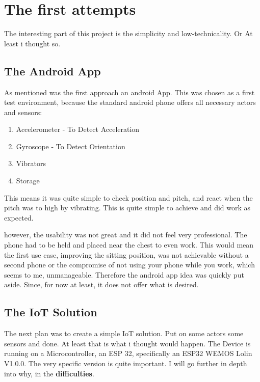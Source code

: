 \chapter*{The first attempts}
\label{chap:The first attempts}
\renewcommand{\thesection}{\arabic{section}}
\setcounter{section}{0}

The interesting part of this project is the simplicity and low-technicality. Or At least i thought so.

\section{The Android App}

As mentioned was the first approach an android App. This was chosen as a first test environment, because the standard android phone offers all necessary actors and sensors: 
\begin{enumerate}
    \item Accelerometer - To Detect Acceleration
    \item Gyroscope - To Detect Orientation
    \item Vibrators
    \item Storage
\end{enumerate}

This means it was quite simple to check position and pitch, and react when the pitch was to high by vibrating. This is quite simple to achieve and did work as expected.

however, the usability was not great and it did not feel very professional. The phone had to be held and placed near the chest to even work. This would mean the first use case, improving the sitting position, was not achievable without a second phone or the compromise of not using your phone while you work, which seems to me, unmanageable. Therefore the android app idea was quickly put aside. Since, for now at least, it does not offer what is desired.

\newpage
\section{The IoT Solution}

The next plan was to create a simple IoT solution. Put on some actors some sensors and done. At least that is what i thought would happen. The Device is running on a Microcontroller, an ESP 32, specifically an ESP32 WEMOS Lolin V1.0.0. The very specific version is quite important. I will go further in depth into why, in the \textbf{difficulties}.

